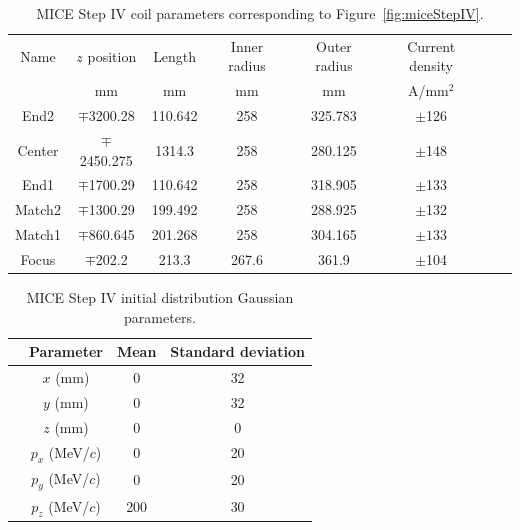 \begin{table}
\caption[MICE Step IV coil parameters.]{MICE Step IV coil parameters corresponding to Figure~\ref{fig:miceStepIV}.}
\begin{center}
\begin{tabularx}{\textwidth}{cccccccc}
\hline \hline
Name & $z$ position & Length & Inner radius & Outer radius & Current density  \vspace{-12pt}\\
 & mm & mm & mm & mm & A/mm$^2$  \\
\hline
	End2 & $\mp$3200.28&110.642&258&325.783&$\pm$126 \vspace{-12pt}\\
	Center&$\mp$2450.275&1314.3&258&280.125&$\pm$148 \vspace{-12pt}\\
	End1 & $\mp$1700.29& 110.642& 258 & 318.905 & $\pm$133 \vspace{-12pt}\\
	Match2 & $\mp$1300.29 & 199.492 & 258 & 288.925 & $\pm$132 \vspace{-12pt}\\
	Match1 & $\mp$860.645 & 201.268 & 258 & 304.165 & $\pm133$ \vspace{-12pt}\\
	Focus & $\mp$202.2 & 213.3 & 267.6 & 361.9 & $\pm$104 \\ 
\hline
\end{tabularx}
\end{center}
\label{tbl:MICE_coil_parameters}
\end{table}

\begin{table}
\caption{MICE Step IV initial distribution Gaussian parameters.}
\begin{center}
\begin{tabularx}{0.7\textwidth}{p{1cm}ccc}
\hline \hline
&Parameter & Mean & Standard deviation \\
\hline
	&$x$ (mm) & 0 & 32\vspace{-12pt}\\
	&$y$ (mm) & 0 & 32\vspace{-12pt} \\
	&$z$ (mm) & 0 & 0\vspace{-12pt} \\
	&$p_x$ (MeV/$c$) & 0 & 20\vspace{-12pt} \\
	&$p_y$ (MeV/$c$) & 0 & 20\vspace{-12pt} \\
	&$p_z$ (MeV/$c$) & 200 & 30\\
\hline
\end{tabularx}
\end{center}
\label{tbl:MICE_initial_distribution_parameters}
\end{table}

